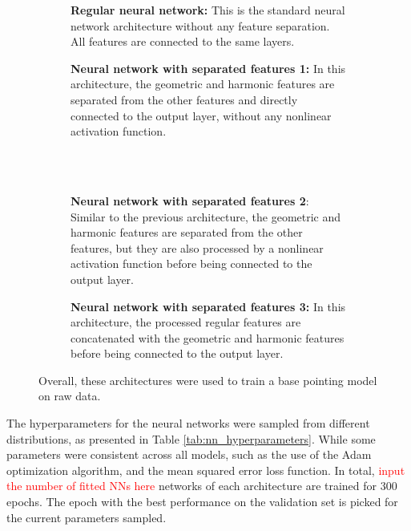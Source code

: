 \begin{figure}[H]
    \centering
    \begin{subfigure}[t]{0.49\textwidth}
        \centering
        
        \caption{\textbf{Regular neural network:}
        This is the standard neural network architecture without any feature separation.
        All features are connected to the same layers.}
        \label{subfig:cm_dt}
    \end{subfigure}
    \hfill
   \begin{subfigure}[t]{0.49\textwidth}
       \centering
       
       \caption{\textbf{Neural network with separated features 1:}
       In this architecture, the geometric and harmonic features are separated from the other features and directly connected to the output layer, without any nonlinear activation function.}
       \label{subfig:cm_rf}
\end{subfigure}
\\~\\
    \begin{subfigure}[t]{0.49\textwidth}
        \centering
        
        \caption{\textbf{Neural network with separated features 2}:
        Similar to the previous architecture, the geometric and harmonic features are separated from the other features,
        but they are also processed by a nonlinear activation function before being connected to the output layer.}
        \label{subfig:cm_bag}
    \end{subfigure}
    \hfill
       \begin{subfigure}[t]{0.49\textwidth}
        \centering
        
        \caption{\textbf{Neural network with separated features 3:}
        In this architecture, the processed regular features are concatenated with the geometric and harmonic features before being connected to the output layer.}
        \label{subfig:cm_bos}
    \end{subfigure}
     \caption{Overall, these architectures were used to train a base pointing model on raw data.}
     \label{fig:nn_architecture}
\end{figure}

The hyperparameters for the neural networks were sampled from different distributions, as presented in Table \ref{tab:nn_hyperparameters}.
While some parameters were consistent across all models, such as the use of the Adam optimization algorithm, and the mean squared error loss function.
In total, \textcolor{red}{input the number of fitted NNs here} networks of each architecture are trained for $300$ epochs.
The epoch with the best performance on the validation set is picked for the current parameters sampled.

